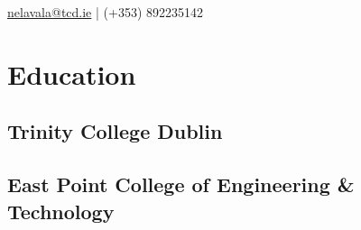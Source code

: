 \documentclass[]{aj-resume-openfont}
\begin{document}
%
%
\lastupdated

%
%


 { %
\href{mailto:nelavala@tcd.ie}{nelavala@tcd.ie} | (+353) 892235142
}

%
%

\begin{minipage}[t]{0.33\textwidth} 


\section{Education} 

\subsection{Trinity College Dublin}
\sectionsep

\subsection{East Point College of \newline Engineering \& Technology}
\sectionsep




\end{minipage}
\end{document}
